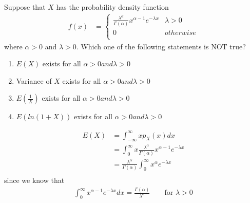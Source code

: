 \documentclass[journal,12pt,twocolumn]{IEEEtran}
\theoremstyle{remark}
\begin{document}



\maketitle

\newpage


\bigskip

\renewcommand{\thefigure}{\theenumi}
\renewcommand{\thetable}{\theenumi}

Suppose that $X$ has the probability density function
\begin{align}
f(x)&=
\begin{cases}
\frac{\lambda^{\alpha}}{\Gamma(\alpha)}x^{\alpha - 1} e^{-\lambda x} & \lambda > 0\\
0 & otherwise\\
\end{cases}
\end{align}
where $\alpha > 0$ and $\lambda > 0$. Which one of the following statements is NOT true?
\begin{enumerate}
\item $E(X)$ exists for all $\alpha > 0 and \lambda > 0$
\item Variance of $X$ exists for all $\alpha > 0 and \lambda > 0$
\item $E(\frac{1}{X})$ exists for all $\alpha > 0 and \lambda > 0$
\item $E(ln(1+X))$ exists for all $\alpha > 0 and \lambda > 0$
\end{enumerate}
\solution
\begin{align}
E(X)&= \int_{-\infty}^{\infty} xp_X(x)dx\\
&= \int_{0}^{\infty} x\frac{\lambda^{\alpha}}{\Gamma(\alpha)}x^{\alpha - 1} e^{-\lambda x}\\
&= \frac{\lambda^{\alpha}}{\Gamma(\alpha)} \int_{0}^{\infty}x^{\alpha} e^{-\lambda x}\\
\end{align}
since we know that 
\begin{align}
\int_0^\infty x^{\alpha - 1} e^{-\lambda x} dx = \frac{\Gamma(\alpha)}{\lambda^{\alpha}} \qquad \textrm{for } \lambda > 0
\end{align}
\end{document}
